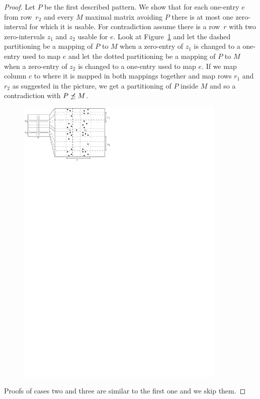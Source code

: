\begin{proof}
Let $P$ be the first described pattern. We show that for each one-entry $e$ from row~$r_2$ and every $M$ maximal matrix avoiding $P$ there is at most one zero-interval for which it is usable. For contradiction assume there is a row~$r$ with two zero-intervals $z_1$ and $z_2$ usable for $e$. Look at Figure~\ref{fig:lemmaI1} and let the dashed partitioning be a mapping of $P$ to $M$ when a zero-entry of $z_1$ is changed to a one-entry used to map $e$ and let the dotted partitioning be a mapping of $P$ to $M$ when a zero-entry of $z_2$ is changed to a one-entry used to map $e$. If we map column $c$ to where it is mapped in both mappings together and map rows $r_1$ and $r_2$ as suggested in the picture, we get a partitioning of $P$ inside $M$ and so a contradiction with $P\not\preceq M$.

\begin{figure}[!ht]
\centering
\includegraphics[width=100mm]{img/lemmaI1.pdf}
\caption{}
\label{fig:lemmaI1}
\end{figure}

Proofs of cases two and three are similar to the first one and we skip them.
\end{proof}

